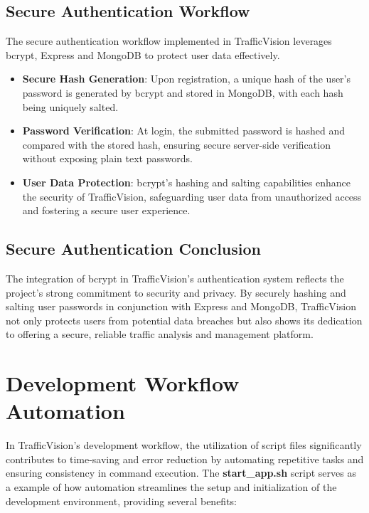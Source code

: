 \subsection{Secure Authentication Workflow}
The secure authentication workflow implemented in TrafficVision leverages bcrypt, Express and MongoDB to protect user data effectively.

\begin{itemize}
    \item \textbf{Secure Hash Generation}: Upon registration, a unique hash of the user's password is generated by bcrypt and stored in MongoDB, with each hash being uniquely salted.
    
    \item \textbf{Password Verification}: At login, the submitted password is hashed and compared with the stored hash, ensuring secure server-side verification without exposing plain text passwords.
    
    \item \textbf{User Data Protection}: bcrypt's hashing and salting capabilities enhance the security of TrafficVision, safeguarding user data from unauthorized access and fostering a secure user experience.
\end{itemize}

\subsection{Secure Authentication Conclusion}
The integration of bcrypt\cite{bcrypt2024} in TrafficVision's authentication system reflects the project's strong commitment to security and privacy. By securely hashing and salting user passwords in conjunction with Express and MongoDB, TrafficVision not only protects users from potential data breaches but also shows its dedication to offering a secure, reliable traffic analysis and management platform.


\section{Development Workflow Automation}

In TrafficVision's development workflow, the utilization of script\cite{shfile} files significantly contributes to time-saving and error reduction by automating repetitive tasks and ensuring consistency in command execution. The \textbf{start\_app.sh} script serves as a example of how automation streamlines the setup and initialization of the development environment, providing several benefits:

